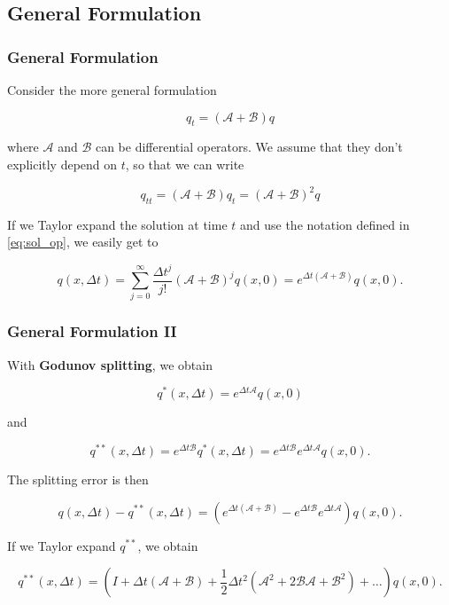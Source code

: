 \documentclass{beamer}
\newcommand{\ca}{\mathcal{A}}
\newcommand{\cb}{\mathcal{B}}
\renewcommand{\d}{\Delta}
\newcommand{\emp}[1]{\textcolor{tum}{\textbf{#1}}}
\begin{document}
\subsection{General Formulation}
\begin{frame}
	\frametitle{General Formulation}
	Consider the more general formulation

	\begin{equation}
		q_t = (\ca+\cb)q
	\end{equation}

	where $\ca$ and $\cb$ can be differential operators. We assume that they don't explicitly depend on $t$, so that we can write

	\begin{equation}
		q_{tt} = (\ca+\cb)q_t=(\ca+\cb)^2q
	\end{equation}

	If we Taylor expand the solution at time $t$ and use the notation defined in \eqref{eq:sol_op}, we easily get to

	\begin{equation}\label{eq:exp_unsplit}
		q(x,\d t) = \sum_{j=0}^{\infty}\frac{\d t^j}{j!}(\ca + \cb)^jq(x,0) = e^{\d t(\ca +\cb)}q(x,0).
	\end{equation}


\end{frame}

\begin{frame}
	\frametitle{General Formulation II}
	With \emp{Godunov splitting}, we obtain

	\begin{equation}
		q^*(x,\d t)=e^{\d t \ca}q(x,0)
	\end{equation}

	and

	\begin{equation}
		q^{**}(x,\d t)=e^{\d t \cb}q^*(x,\d t) = e^{\d t \cb}e^{\d t \ca}q(x,0).
	\end{equation}

	The splitting error is then

	\begin{equation}
		q(x,\d t)-q^{**}(x,\d t) = (e^{\d t(\ca +\cb)}-e^{\d t \cb}e^{\d t \ca})q(x,0).
	\end{equation}

	If we Taylor expand $q^{**}$, we obtain

	\begin{equation}\label{eq:exp_split}
		q^{**}(x,\d t) = (I+\d t(\ca + \cb)+\frac{1}{2}\d t^2(\ca^2+2\cb\ca+\cb^2)+\dots)q(x,0).
	\end{equation}

\end{frame}
\end{document}
